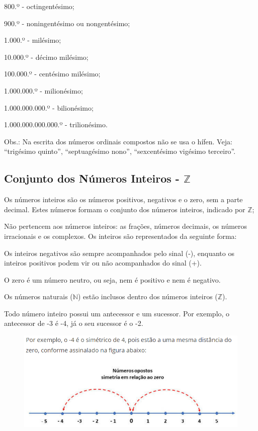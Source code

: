 \begin{multicols*}{2}
\begin{enumerate}
		      800.º - octingentésimo;

		      900.º - noningentésimo ou nongentésimo;

		      1.000.º - milésimo;

		      10.000.º - décimo milésimo;

		      100.000.º - centésimo milésimo;

		      1.000.000.º - milionésimo;

		      1.000.000.000.º - bilionésimo;

		      1.000.000.000.000.º - trilionésimo.

		      Obs.: Na escrita dos números ordinais compostos não se usa o hífen. Veja: “trigésimo quinto”, “septuagésimo nono”, “sexcentésimo vigésimo terceiro”.

	\end{enumerate}

	\subsection{Conjunto dos Números Inteiros - $\mathbb{Z}$}

	Os números inteiros são os números positivos, negativos e o zero, sem a parte decimal. Estes números formam o conjunto dos números inteiros, indicado por $\mathbb{Z}$;

	Não pertencem aos números inteiros: as frações, números decimais, os números irracionais e os complexos. Os inteiros são representados da seguinte forma:


	Os inteiros negativos são sempre acompanhados pelo sinal (-), enquanto os inteiros positivos podem vir ou não acompanhados do sinal (+).

	O zero é um número neutro, ou seja, nem é positivo e nem é negativo.

	Os números naturais ($\mathbb{N}$) estão inclusos dentro dos números inteiros ($\mathbb{Z}$).

	Todo número inteiro possui um antecessor e um sucessor. Por exemplo, o antecessor de -3 é -4, já o seu sucessor é o -2.\\

	\begin{figure}[H]
		\centering
		\includegraphics[width=\columnwidth]{assets/Reta Conjunto dos Inteiros.png}
	\end{figure}



\end{multicols*}
